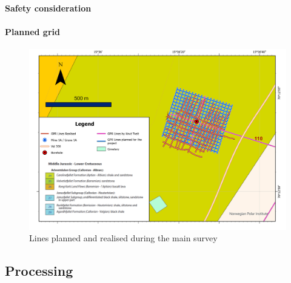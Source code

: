 \paragraph{Safety consideration}

\paragraph{Planned grid}

\begin{figure}
    \centering
    \includegraphics[width=\linewidth]{Images/00_Methodology/GPR LIne.jpg}
    \caption{Lines planned and realised during the main survey}
    \label{fig:GPRLines}
\end{figure}

\subsection{Processing}